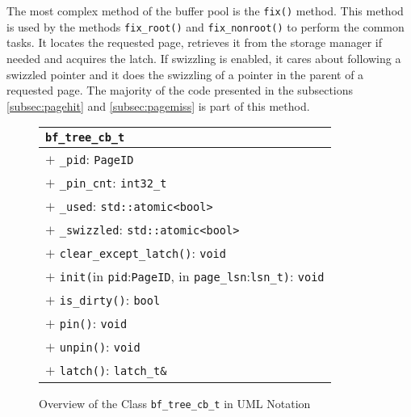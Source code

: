 	The most complex method of the buffer pool is the \lstinline{fix()} method. This method is used by the methods \lstinline{fix_root()} and \lstinline{fix_nonroot()} to perform the common tasks. It locates the requested page, retrieves it from the storage manager if needed and acquires the latch. If swizzling is enabled, it cares about following a swizzled pointer and it does the swizzling of a pointer in the parent of a requested page. The majority of the code presented in the subsections \ref{subsec:pagehit} and \ref{subsec:pagemiss} is part of this method.

\begin{@empty}
	\begin{figure}[ht!]
		\centering
		\scriptsize
		\setlength{\fboxsep}{0pt}
		\colorbox{listingsbackground}{\begin{tabularx}{\textwidth}{|X|}
			\hline
			\texttt{\textbf{bf\_tree\_cb\_t}}																																\\	\hline
			$+$ \texttt{\_pid}: \texttt{PageID}																															\\
			$+$ \texttt{\_pin\_cnt}: \texttt{int32\_t}																														\\
			$+$ \texttt{\_used}: \texttt{std::atomic<bool>}																													\\
			$+$ \texttt{\_swizzled}: \texttt{std::atomic<bool>}																												\\	\hline
			$+$ \texttt{clear\_except\_latch()}: \texttt{void}																													\\
			$+$ \texttt{init(}in \texttt{pid}:\texttt{PageID}, in \texttt{page\_lsn}:\texttt{lsn\_t)}: \texttt{void}																					\\
			$+$ \texttt{is\_dirty()}: \texttt{bool}																															\\
			$+$ \texttt{pin()}: \texttt{void}																																\\
			$+$ \texttt{unpin()}: \texttt{void}																																\\
			$+$ \texttt{latch()}: \texttt{latch\_t\&}																															\\	\hline
		\end{tabularx}}
        \vspace{.5em}
		\caption{Overview of the Class \lstinline{bf_tree_cb_t} in UML Notation}
		\label{fig:cbdesign}
	\end{figure}
\end{@empty}

